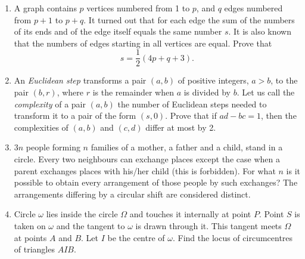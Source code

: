 \documentclass[12pt]{scrartcl}
\begin{document}
\begin{enumerate}[resume]
    \item[\textbf{5.}] A graph contains $p$ vertices numbered from 1 to $p$, and $q$ edges numbered from $p + 1$ to $p + q$. It turned out that for each edge the sum of the numbers of its ends and of the edge itself equals the same number $s$. It is also known that the numbers of edges starting in all vertices are equal. Prove that
    \[ s = \frac{1}{2}(4p + q + 3). \]
    

    \item[\textbf{6.}] An \textit{Euclidean step} transforms a pair $(a, b)$ of positive integers, $a > b$, to the pair $(b, r)$, where $r$ is the remainder when $a$ is divided by $b$. Let us call the \textit{complexity} of a pair $(a, b)$ the number of Euclidean steps needed to transform it to a pair of the form $(s, 0)$. Prove that if $ad - bc = 1$, then the complexities of $(a, b)$ and $(c, d)$ differ at most by 2. 

    \item[\textbf{7.}] $3n$ people forming $n$ families of a mother, a father and a child, stand in a circle. Every two neighbours can exchange places except the case when a parent exchanges places with his/her child (this is forbidden). For what $n$ is it possible to obtain every arrangement of those people by such exchanges? The arrangements differing by a circular shift are considered distinct. 

    \item[\textbf{8.}] Circle $\omega$ lies inside the circle $\Omega$ and touches it internally at point $P$. Point $S$ is taken on $\omega$ and the tangent to $\omega$ is drawn through it. This tangent meets $\Omega$ at points $A$ and $B$. Let $I$ be the centre of $\omega$. Find the locus of circumcentres of triangles $AIB$. 
\end{enumerate}
\end{document}
